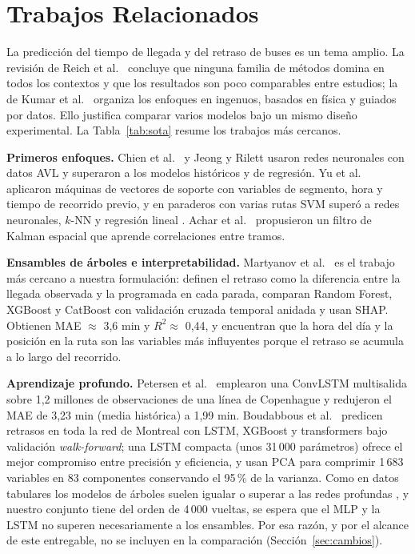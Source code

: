 \documentclass[conference,spanish]{IEEEtran}
\begin{document}
\section{Trabajos Relacionados}

La predicción del tiempo de llegada y del retraso de buses es un tema amplio. La revisión de Reich et al.\ \cite{reich2019} concluye que ninguna familia de métodos domina en todos los contextos y que los resultados son poco comparables entre estudios; la de Kumar et al.\ \cite{kumar2025review} organiza los enfoques en ingenuos, basados en física y guiados por datos. Ello justifica comparar varios modelos bajo un mismo diseño experimental. La Tabla~\ref{tab:sota} resume los trabajos más cercanos.

\textbf{Primeros enfoques.} Chien et al.\ \cite{chien2002} y Jeong y Rilett \cite{jeong2004} usaron redes neuronales con datos AVL y superaron a los modelos históricos y de regresión. Yu et al.\ \cite{yu2006} aplicaron máquinas de vectores de soporte con variables de segmento, hora y tiempo de recorrido previo, y en paraderos con varias rutas SVM superó a redes neuronales, $k$-NN y regresión lineal \cite{yu2011}. Achar et al.\ \cite{achar2020} propusieron un filtro de Kalman espacial que aprende correlaciones entre tramos.

\textbf{Ensambles de árboles e interpretabilidad.} Martyanov et al.\ \cite{martyanov2026} es el trabajo más cercano a nuestra formulación: definen el retraso como la diferencia entre la llegada observada y la programada en cada parada, comparan Random Forest, XGBoost y CatBoost con validación cruzada temporal anidada y usan SHAP. Obtienen MAE $\approx$ 3,6 min y $R^2\approx$ 0,44, y encuentran que la hora del día y la posición en la ruta son las variables más influyentes porque el retraso se acumula a lo largo del recorrido.

\textbf{Aprendizaje profundo.} Petersen et al.\ \cite{petersen2019} emplearon una ConvLSTM multisalida sobre 1,2 millones de observaciones de una línea de Copenhague y redujeron el MAE de 3,23 min (media histórica) a 1,99 min. Boudabbous et al.\ \cite{boudabbous2026} predicen retrasos en toda la red de Montreal con LSTM, XGBoost y transformers bajo validación \textit{walk-forward}; una LSTM compacta (unos 31\,000 parámetros) ofrece el mejor compromiso entre precisión y eficiencia, y usan PCA para comprimir 1\,683 variables en 83 componentes conservando el 95\,\% de la varianza. Como en datos tabulares los modelos de árboles suelen igualar o superar a las redes profundas \cite{grinsztajn2022}, y nuestro conjunto tiene del orden de 4\,000 vueltas, se espera que el MLP y la LSTM no superen necesariamente a los ensambles. Por esa razón, y por el alcance de este entregable, no se incluyen en la comparación (Sección~\ref{sec:cambios}).
\end{document}
